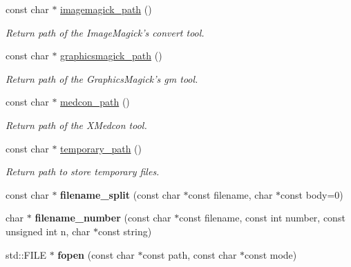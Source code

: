 \begin{DoxyCompactItemize}
\item 
const char $\ast$ \hyperlink{namespacecimg__library_1_1cimg_a66b97c48fa2e598dd3818152cca7e4f0}{imagemagick\_\-path} ()
\begin{DoxyCompactList}\small\item\em Return path of the ImageMagick's {\ttfamily convert} tool. \item\end{DoxyCompactList}\item 
const char $\ast$ \hyperlink{namespacecimg__library_1_1cimg_a427f31124296fa11e951bb2536e4e88b}{graphicsmagick\_\-path} ()
\begin{DoxyCompactList}\small\item\em Return path of the GraphicsMagick's {\ttfamily gm} tool. \item\end{DoxyCompactList}\item 
const char $\ast$ \hyperlink{namespacecimg__library_1_1cimg_a9ab62b36cd320543e0b0ab830252cb10}{medcon\_\-path} ()
\begin{DoxyCompactList}\small\item\em Return path of the {\ttfamily XMedcon} tool. \item\end{DoxyCompactList}\item 
const char $\ast$ \hyperlink{namespacecimg__library_1_1cimg_a411c598d6a44291415a1e2299d2c39b1}{temporary\_\-path} ()
\begin{DoxyCompactList}\small\item\em Return path to store temporary files. \item\end{DoxyCompactList}\item 
\hypertarget{namespacecimg__library_1_1cimg_aaff7e5c864061caac3ef4cc2602ec273}{
const char $\ast$ {\bfseries filename\_\-split} (const char $\ast$const filename, char $\ast$const body=0)}
\label{namespacecimg__library_1_1cimg_aaff7e5c864061caac3ef4cc2602ec273}

\item 
\hypertarget{namespacecimg__library_1_1cimg_ae0e40e3945809b622dad64752fb31ea2}{
char $\ast$ {\bfseries filename\_\-number} (const char $\ast$const filename, const int number, const unsigned int n, char $\ast$const string)}
\label{namespacecimg__library_1_1cimg_ae0e40e3945809b622dad64752fb31ea2}

\item 
\hypertarget{namespacecimg__library_1_1cimg_a19ad60edf05bad32e75b7077509ef566}{
std::FILE $\ast$ {\bfseries fopen} (const char $\ast$const path, const char $\ast$const mode)}
\label{namespacecimg__library_1_1cimg_a19ad60edf05bad32e75b7077509ef566}


\end{DoxyCompactItemize}
